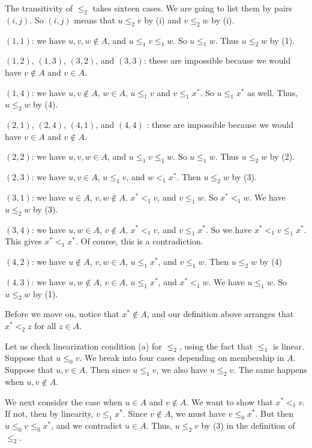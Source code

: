 \documentclass[letterpaper]{article} %
\theoremstyle{definition}
\begin{document}
\medskip

The transitivity of $\leq_2$ takes sixteen cases.  We are going to list them by pairs $(i,j)$.
So $(i,j)$ means that $u \leq_2 v$ by (i) and $v \leq_2 w$ by (i).


$(1,1)$: we have $u,v,w\notin A$,  and 
$u \leq_1 v \leq_1 w$.   So $u \leq_1 w$.    Thus  $u \leq_2 w$ by (1).

$(1,2)$, $(1,3)$, $(3,2)$, and $(3,3)$: these are impossible because we would have $v\notin A$ and $v\in A$.

 

$(1,4)$:  we have $u,v\notin A$, $w\in A$, $u\leq_1 v$ and $v \leq_1 x^*$.
So $u \leq_1 x^*$ as well. 
Thus, $u\leq_2 w$ by (4).

$(2,1)$, $(2,4)$,
$(4,1)$, and  $(4,4)$ : these are impossible  because we would have  $v\in A$ and $v\notin A$.


$(2,2)$: we have $u,v,w\in A$,  and 
$u \leq_1 v \leq_1 w$.   So $u \leq_1 w$.    Thus  $u \leq_2 w$ by (2).

$(2,3)$: we have $u,v\in A$, $u\leq_1 v$,  and $w <_1 x^*$. 
Then  $u \leq_2 w$ by (3).

$(3,1)$: we have $u\in A$, $v,w\notin A$, $x^*<_1 v$, and $v \leq_1 w$.
So $x^* <_1 w$.   We have $u \leq_2 w$ by (3).


$(3,4)$: we have $u, w\in A$, $v\notin A$, $x^* <_1 v$, and $v\leq_1 x^*$.
So we have $x^* <_1 v \leq_1 x^*$.  This gives $x^* <_1 x^*$.  Of course, this is a contradiction.

 

$(4,2)$: we have $u\notin A$, $v,w\in A$, $u\leq_1 x^*$, and $v \leq_1 w$.   
Then $u \leq_2 w$ by (4)

$(4,3)$: we have  $u,w\notin A$, $v\in A$, $u\leq_1 x^*$, and $x^* <_1 w$.
We have $u \leq_1 w$.   So  $u \leq_2 w$ by (1).
 
 \medskip


Before we move on,
notice that  $x^*\notin A$, and our definition above arranges that
$x^* <_2 z$ for all $z\in A$. 

 \medskip
 
Let us check linearization condition  (a) for   $\leq_2$, using the fact that $\leq_1$ is linear.
  Suppose that  $u\leq_0 v$.
We break into four cases depending on membership in $A$.
Suppose that $u, v\in A$.  Then since $u\leq_1 v$, we also have $u \leq_2 v$.
The same happens when $u, v\notin A$.

We next consider the case when $u\in A$ and $v\notin A$.
We want to show that $x^* <_1 v$.  If not, then by linearity, $v\leq_1 x^*$.
Since $v\notin A$, we must have $v \leq_0 x^*$.  But then $u \leq_0 v \leq_0 x^*$,
and we contradict $u\in A$.  Thus, $u\leq_2 v$ by (3) in the definition of $\leq_2$.
\end{document}
